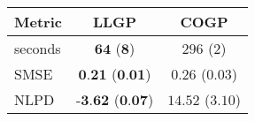 \begin{tabular}{lcc}\toprule
Metric & LLGP & COGP\\
\midrule
seconds & $\textbf{64}$ ($\textbf{8}$) & $296$ ($2$)\\
SMSE & $\textbf{0.21}$ ($\textbf{0.01}$) & $0.26$ ($0.03$)\\
NLPD & $\textbf{-3.62}$ ($\textbf{0.07}$) & $14.52$ ($3.10$)
 \\
\bottomrule
\end{tabular}
